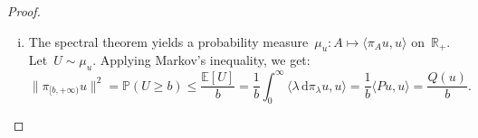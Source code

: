 \documentclass[10pt]{article}
\newcommand{\cL}{\mathcal{L}}
\renewcommand{\d}{\mathrm{d}}
\newcommand{\R}{\mathbb{R}}
\newcommand{\1}{\mathbbm 1}
\newtheorem{theorem}{Theorem}
\newtheorem{proposition}{Proposition}
\begin{document}
\begin{proof}
\begin{enumerate}[i)]
{            }
            \item{
                The spectral theorem yields a probability measure~$\mu_u : A \mapsto \langle \pi_A u,u\rangle$ on~$\R_+$. Let~$U\sim \mu_u$.
                Applying Markov's inequality, we get:
                \begin{equation}
                    \|\pi_{[b,+\infty)}u\|^2 = \mathbb P (U \geq b) \leq \frac{\mathbb E[U]}{b} = \frac1b\int_0^\infty \langle \lambda\,\d\pi_{\lambda}u,u\rangle = \frac1b\langle Pu,u\rangle = \frac{Q(u)}b.
                \end{equation}
            }
        \end{enumerate}        
    \end{proof}




        



\end{document}
